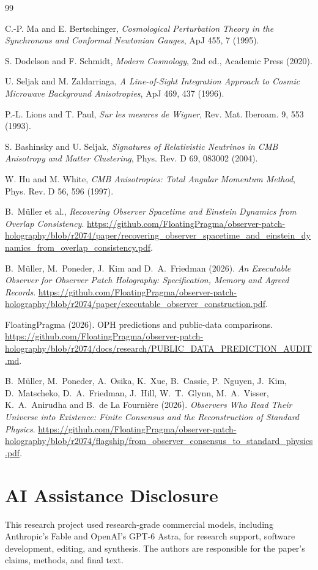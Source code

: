 \documentclass[11pt]{article}
\theoremstyle{remark}
\begin{document}
\begin{thebibliography}{99}

C.-P. Ma and E. Bertschinger, \emph{Cosmological Perturbation Theory
in the Synchronous and Conformal Newtonian Gauges}, ApJ 455, 7 (1995).

S. Dodelson and F. Schmidt, \emph{Modern Cosmology}, 2nd ed., Academic
Press (2020).

U. Seljak and M. Zaldarriaga, \emph{A Line-of-Sight Integration
Approach to Cosmic Microwave Background Anisotropies}, ApJ 469, 437 (1996).

P.-L. Lions and T. Paul, \emph{Sur les mesures de Wigner}, Rev. Mat.
Iberoam. 9, 553 (1993).

S. Bashinsky and U. Seljak, \emph{Signatures of Relativistic Neutrinos
in CMB Anisotropy and Matter Clustering}, Phys. Rev. D 69, 083002 (2004).

W. Hu and M. White, \emph{CMB Anisotropies: Total Angular Momentum
Method}, Phys. Rev. D 56, 596 (1997).

B.~M\"uller et al., \emph{Recovering Observer Spacetime and Einstein
Dynamics from Overlap Consistency}.
\url{https://github.com/FloatingPragma/observer-patch-holography/blob/r2074/paper/recovering_observer_spacetime_and_einstein_dynamics_from_overlap_consistency.pdf}.

B.~M\"uller, M.~Poneder, J.~Kim and D.~A.~Friedman (2026). \emph{An Executable
Observer for Observer Patch Holography: Specification, Memory and Agreed
Records}.
\url{https://github.com/FloatingPragma/observer-patch-holography/blob/r2074/paper/executable_observer_construction.pdf}.

FloatingPragma (2026). OPH predictions and public-data comparisons.
\url{https://github.com/FloatingPragma/observer-patch-holography/blob/r2074/docs/research/PUBLIC_DATA_PREDICTION_AUDIT.md}.

B.~M\"uller, M.~Poneder, A.~Osika, K.~Xue, B.~Cassie, P.~Nguyen, J.~Kim,
D.~Matscheko, D.~A.~Friedman, J.~Hill, W.~T.~Glynn, M.~A.~Visser,
K.~A.~Anirudha and B.~de La Fourni\`ere (2026). \emph{Observers Who Read Their
Universe into Existence: Finite Consensus and the Reconstruction of Standard
Physics}.
\url{https://github.com/FloatingPragma/observer-patch-holography/blob/r2074/flagship/from_observer_consensus_to_standard_physics.pdf}.

\end{thebibliography}

\section*{AI Assistance Disclosure}
This research project used research-grade commercial models, including
Anthropic's Fable and OpenAI's GPT-6 Astra, for research support, software
development, editing, and synthesis. The authors are responsible for the
paper's claims, methods, and final text.
\end{document}
